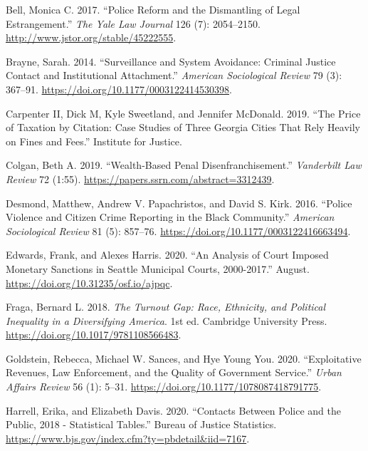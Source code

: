 \documentclass[
  12pt,
]{article}
\newlength{\cslhangindent}
\newenvironment{cslreferences}%
  {\setlength{\parindent}{0pt}%
  \everypar{\setlength{\hangindent}{\cslhangindent}}\ignorespaces}%
  {\par}
\begin{document}
\hypertarget{refs}{}
\begin{cslreferences}
\leavevmode\hypertarget{ref-Bell2017}{}%
Bell, Monica C. 2017. ``Police Reform and the Dismantling of Legal Estrangement.'' \emph{The Yale Law Journal} 126 (7): 2054--2150. \url{http://www.jstor.org/stable/45222555}.

\leavevmode\hypertarget{ref-Brayne2014}{}%
Brayne, Sarah. 2014. ``Surveillance and System Avoidance: Criminal Justice Contact and Institutional Attachment.'' \emph{American Sociological Review} 79 (3): 367--91. \url{https://doi.org/10.1177/0003122414530398}.

\leavevmode\hypertarget{ref-CarpenterII2019}{}%
Carpenter II, Dick M, Kyle Sweetland, and Jennifer McDonald. 2019. ``The Price of Taxation by Citation: Case Studies of Three Georgia Cities That Rely Heavily on Fines and Fees.'' Institute for Justice.

\leavevmode\hypertarget{ref-Colgan2019}{}%
Colgan, Beth A. 2019. ``Wealth-Based Penal Disenfranchisement.'' \emph{Vanderbilt Law Review} 72 (1:55). \url{https://papers.ssrn.com/abstract=3312439}.

\leavevmode\hypertarget{ref-Desmond2016}{}%
Desmond, Matthew, Andrew V. Papachristos, and David S. Kirk. 2016. ``Police Violence and Citizen Crime Reporting in the Black Community.'' \emph{American Sociological Review} 81 (5): 857--76. \url{https://doi.org/10.1177/0003122416663494}.

\leavevmode\hypertarget{ref-Edwards2020}{}%
Edwards, Frank, and Alexes Harris. 2020. ``An Analysis of Court Imposed Monetary Sanctions in Seattle Municipal Courts, 2000-2017.'' August. \url{https://doi.org/10.31235/osf.io/ajpqc}.

\leavevmode\hypertarget{ref-Fraga2018}{}%
Fraga, Bernard L. 2018. \emph{The Turnout Gap: Race, Ethnicity, and Political Inequality in a Diversifying America}. 1st ed. Cambridge University Press. \url{https://doi.org/10.1017/9781108566483}.

\leavevmode\hypertarget{ref-Goldstein2020}{}%
Goldstein, Rebecca, Michael W. Sances, and Hye Young You. 2020. ``Exploitative Revenues, Law Enforcement, and the Quality of Government Service.'' \emph{Urban Affairs Review} 56 (1): 5--31. \url{https://doi.org/10.1177/1078087418791775}.

\leavevmode\hypertarget{ref-Harrell2020}{}%
Harrell, Erika, and Elizabeth Davis. 2020. ``Contacts Between Police and the Public, 2018 - Statistical Tables.'' Bureau of Justice Statistics. \url{https://www.bjs.gov/index.cfm?ty=pbdetail\&iid=7167}.


\end{cslreferences}
\end{document}
